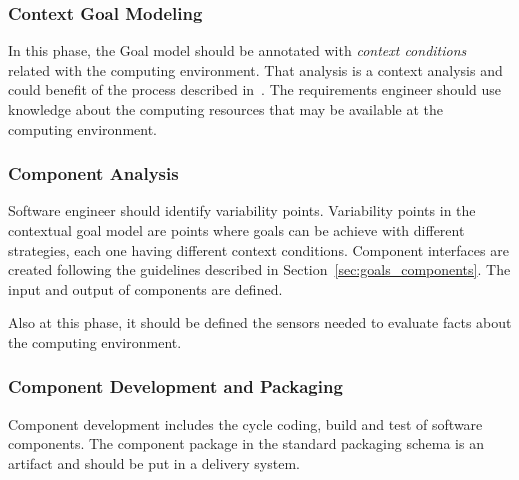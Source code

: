 \subsubsection{Context Goal Modeling}
In this phase, the Goal model should be annotated with \emph{context conditions} related with the computing environment. That analysis is a context analysis and could benefit of the process described in~\cite{ali_goal-based_2010}. The requirements engineer should use knowledge about the computing resources that may be available at the computing environment.


\subsubsection{Component Analysis}
Software engineer should identify variability points.
Variability points in the contextual goal model are points where goals can be achieve with different strategies, each one having different context conditions.
Component interfaces are created following the guidelines described in Section~\ref{sec:goals_components}. The input and output of components are defined.

Also at this phase, it should be defined the sensors needed to evaluate facts about the computing environment.

\subsubsection{Component Development and Packaging}

Component development includes the cycle coding, build and test of software components.
The component package in the standard packaging schema is an artifact and should be put in a delivery system.
